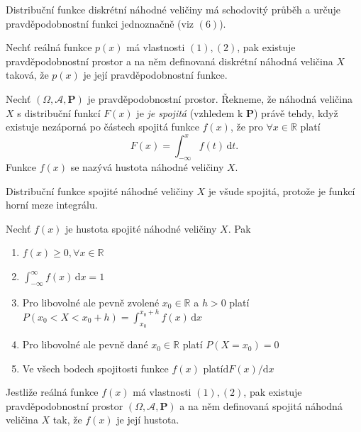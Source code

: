 \begin{notes}
Distribuční funkce diskrétní náhodné veličiny má schodovitý průběh a určuje pravděpodobnostní funkci jednoznačně (viz $(6)$).
\end{notes}

\begin{theorem}
Nechť reálná funkce $p(x)$ má vlastnosti $(1),(2)$, pak existuje pravděpodobnostní prostor a na něm definovaná diskrétní náhodná veličina $X$ taková, že $p(x)$ je její pravděpodobnostní funkce.
\end{theorem}


\begin{definition}
Nechť $(\Omega,\mathcal{A},\textbf{P})$ je pravděpodobnostní prostor. Řekneme, že náhodná veličina $X$ s distribuční funkcí $F(x)$ je \textit{je spojitá} (vzhledem k $\textbf{P}$) právě tehdy, když existuje nezáporná po částech spojitá funkce $f(x)$, že pro $\forall x \in \mathbb{R}$ platí 
\begin{equation}
F(x)=\int_{-\infty}^x f(t)\, \mathrm{d} t.
\end{equation}
Funkce $f(x)$ se nazývá hustota náhodné veličiny $X$.
\end{definition}

\begin{notes}
Distribuční funkce spojité náhodné veličiny $X$ je všude spojitá, protože je funkcí horní meze integrálu.
\end{notes}

\begin{theorem}
Nechť $f(x)$ je hustota spojité náhodné veličiny $X$. Pak 
\begin{enumerate}
\item $f(x)\geq 0, \forall x \in \mathbb{R}$
\item $\int_{-\infty}^{\infty} f(x)\, \mathrm{d} x=1$
\item Pro libovolné ale pevně zvolené $x_0\in \mathbb{R}$ a $h>0 $ platí $P(x_0<X<x_0+h)=\int_{x_0}^{x_0+h}f(x)\, \mathrm{d}x$
\item Pro libovolné ale pevně dané $x_0\in \mathbb{R}$ platí $P(X=x_0)=0$
\item Ve všech bodech spojitosti funkce $f(x)$ platí$ \mathrm{d}F(x)/\mathrm{d}x$
\end{enumerate}
\end{theorem}

\begin{theorem}
Jestliže reálná funkce $f(x)$ má vlastnosti $(1),(2)$, pak existuje pravděpodobnostní prostor $(\Omega,\mathcal{A},\textbf{P})$ a na něm definovaná spojitá náhodná veličina $X$ tak, že $f(x)$ je její hustota.
\end{theorem}

